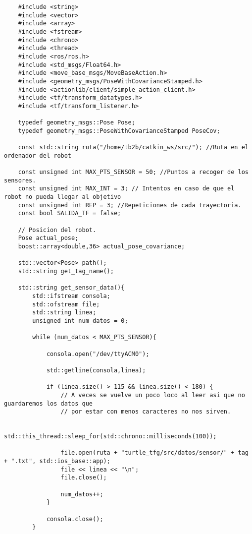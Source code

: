 \begin{lstlisting}
    #include <string>
    #include <vector>
    #include <array>
    #include <fstream>
    #include <chrono>
    #include <thread>
    #include <ros/ros.h>
    #include <std_msgs/Float64.h>
    #include <move_base_msgs/MoveBaseAction.h>
    #include <geometry_msgs/PoseWithCovarianceStamped.h>
    #include <actionlib/client/simple_action_client.h>
    #include <tf/transform_datatypes.h>
    #include <tf/transform_listener.h>
    
    typedef geometry_msgs::Pose Pose;
    typedef geometry_msgs::PoseWithCovarianceStamped PoseCov;
    
    const std::string ruta("/home/tb2b/catkin_ws/src/"); //Ruta en el ordenador del robot
    
    const unsigned int MAX_PTS_SENSOR = 50; //Puntos a recoger de los sensores.
    const unsigned int MAX_INT = 3; // Intentos en caso de que el robot no pueda llegar al objetivo
    const unsigned int REP = 3; //Repeticiones de cada trayectoria.
    const bool SALIDA_TF = false;
    
    // Posicion del robot.
    Pose actual_pose;
    boost::array<double,36> actual_pose_covariance;
    
    std::vector<Pose> path();
    std::string get_tag_name();
    
    std::string get_sensor_data(){
        std::ifstream consola;
        std::ofstream file; 
        std::string linea;
        unsigned int num_datos = 0;
    
        while (num_datos < MAX_PTS_SENSOR){
            
            consola.open("/dev/ttyACM0");
    
            std::getline(consola,linea);
    
            if (linea.size() > 115 && linea.size() < 180) {
                // A veces se vuelve un poco loco al leer asi que no guardaremos los datos que 
                // por estar con menos caracteres no nos sirven.
                
                std::this_thread::sleep_for(std::chrono::milliseconds(100));
    
                file.open(ruta + "turtle_tfg/src/datos/sensor/" + tag + ".txt", std::ios_base::app);
                file << linea << "\n";
                file.close();
            
                num_datos++;
            }
            
            consola.close();
        }
    

\end{lstlisting}
